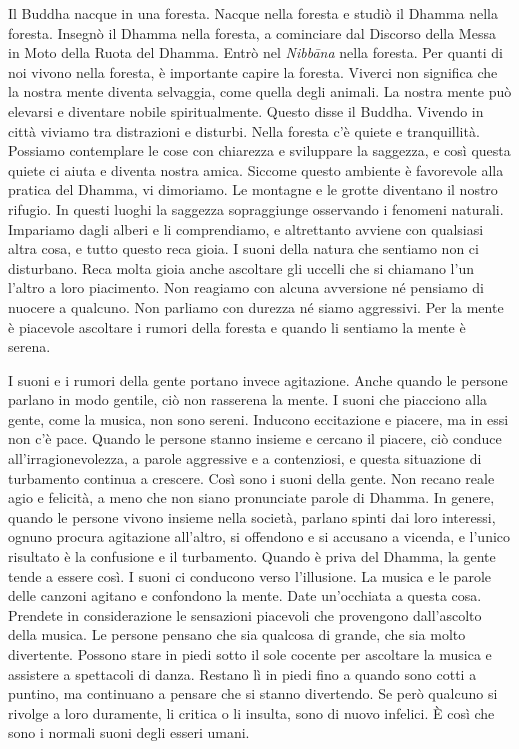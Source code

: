 Il Buddha nacque in una foresta. Nacque nella foresta e studiò il Dhamma
nella foresta. Insegnò il Dhamma nella foresta, a cominciare dal
Discorso della Messa in Moto della Ruota del Dhamma. Entrò nel
\emph{Nibbāna} nella foresta. Per quanti di noi vivono nella foresta, è
importante capire la foresta. Viverci non significa che la nostra mente
diventa selvaggia, come quella degli animali. La nostra mente può
elevarsi e diventare nobile spiritualmente. Questo disse il Buddha.
Vivendo in città viviamo tra distrazioni e disturbi. Nella foresta c'è
quiete e tranquillità. Possiamo contemplare le cose con chiarezza e
sviluppare la saggezza, e così questa quiete ci aiuta e diventa nostra
amica. Siccome questo ambiente è favorevole alla pratica del Dhamma, vi
dimoriamo. Le montagne e le grotte diventano il nostro rifugio. In
questi luoghi la saggezza sopraggiunge osservando i fenomeni naturali.
Impariamo dagli alberi e li comprendiamo, e altrettanto avviene con
qualsiasi altra cosa, e tutto questo reca gioia. I suoni della natura
che sentiamo non ci disturbano. Reca molta gioia anche ascoltare gli
uccelli che si chiamano l'un l'altro a loro piacimento. Non reagiamo con
alcuna avversione né pensiamo di nuocere a qualcuno. Non parliamo con
durezza né siamo aggressivi. Per la mente è piacevole ascoltare i rumori
della foresta e quando li sentiamo la mente è serena.

I suoni e i rumori della gente portano invece agitazione. Anche quando
le persone parlano in modo gentile, ciò non rasserena la mente. I suoni
che piacciono alla gente, come la musica, non sono sereni. Inducono
eccitazione e piacere, ma in essi non c'è pace. Quando le persone stanno
insieme e cercano il piacere, ciò conduce all'irragionevolezza, a
parole aggressive e a contenziosi, e questa situazione di turbamento
continua a crescere. Così sono i suoni della gente. Non recano reale
agio e felicità, a meno che non siano pronunciate parole di Dhamma. In
genere, quando le persone vivono insieme nella società, parlano spinti
dai loro interessi, ognuno procura agitazione all'altro, si offendono e
si accusano a vicenda, e l'unico risultato è la confusione e il
turbamento. Quando è priva del Dhamma, la gente tende a essere così. I
suoni ci conducono verso l'illusione. La musica e le parole delle
canzoni agitano e confondono la mente. Date un'occhiata a questa cosa.
Prendete in considerazione le sensazioni piacevoli che provengono
dall'ascolto della musica. Le persone pensano che sia qualcosa di
grande, che sia molto divertente. Possono stare in piedi sotto il sole
cocente per ascoltare la musica e assistere a spettacoli di danza.
Restano lì in piedi fino a quando sono cotti a puntino, ma continuano a
pensare che si stanno divertendo. Se però qualcuno si rivolge a loro
duramente, li critica o li insulta, sono di nuovo infelici. È così che
sono i normali suoni degli esseri umani.

